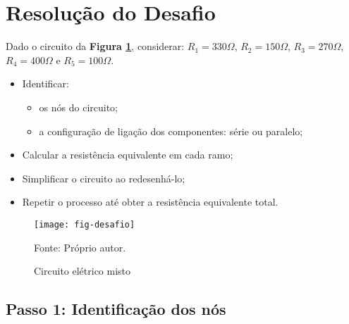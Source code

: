\section{Resolução do Desafio}

\begin{minipage}{\linewidth}
  \centering
  \begin{minipage}{0.45\linewidth}
    Dado o circuito da \textbf{Figura \ref{fig:CircuitoDesafio}},
    considerar: $R_1 = 330\Omega$,
                $R_2 = 150\Omega$,
                $R_3 = 270\Omega$, \\
                $R_4 = 400\Omega$ e
                $R_5 = 100\Omega$.
    \begin{itemize}
      \item Identificar:
      \begin{itemize}
        \item os nós do circuito;
        \item a configuração de ligação dos componentes: série ou paralelo;
      \end{itemize}
      \item Calcular a resistência equivalente em cada ramo;
      \item Simplificar o circuito ao redesenhá-lo;
      \item Repetir o processo até obter a resistência equivalente total.
    \end{itemize}
  \end{minipage}
  \hspace{0.05\linewidth}
  \begin{minipage}{0.45\linewidth}
    \begin{figure}[H]
      \centering
      \caption{Circuito elétrico misto}
      \label{fig:CircuitoDesafio}
      \texttt{[image: fig-desafio]}

      {\small Fonte: Próprio autor.}
    \end{figure}
  \end{minipage}
\end{minipage}






\subsection{Passo 1: Identificação dos nós}

